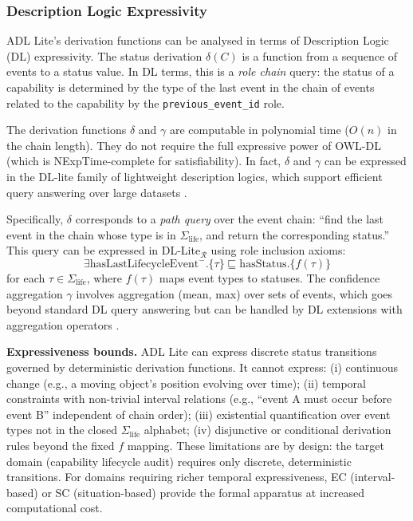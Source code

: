 \subsubsection{Description Logic Expressivity}

ADL Lite's derivation functions can be analysed in terms of Description Logic (DL) expressivity. The status derivation $\delta(C)$ is a function from a sequence of events to a status value. In DL terms, this is a \emph{role chain} query: the status of a capability is determined by the type of the last event in the chain of events related to the capability by the \texttt{previous\_event\_id} role.

The derivation functions $\delta$ and $\gamma$ are computable in polynomial time ($O(n)$ in the chain length). They do not require the full expressive power of OWL-DL (which is NExpTime-complete for satisfiability). In fact, $\delta$ and $\gamma$ can be expressed in the DL-lite family of lightweight description logics, which support efficient query answering over large datasets \cite{dl_lite}.

Specifically, $\delta$ corresponds to a \emph{path query} over the event chain: ``find the last event in the chain whose type is in $\Sigma_{\text{life}}$, and return the corresponding status.'' This query can be expressed in DL-Lite$_{\mathcal{R}}$ using role inclusion axioms:
\begin{equation}
    \exists \text{hasLastLifecycleEvent}^-.\{\tau\} \sqsubseteq \text{hasStatus}.\{f(\tau)\}
\end{equation}
for each $\tau \in \Sigma_{\text{life}}$, where $f(\tau)$ maps event types to statuses. The confidence aggregation $\gamma$ involves aggregation (mean, max) over sets of events, which goes beyond standard DL query answering but can be handled by DL extensions with aggregation operators \cite{dl_lite}.

\textbf{Expressiveness bounds.} ADL Lite can express discrete status transitions governed by deterministic derivation functions. It cannot express: (i) continuous change (e.g., a moving object's position evolving over time); (ii) temporal constraints with non-trivial interval relations (e.g., ``event A must occur before event B'' independent of chain order); (iii) existential quantification over event types not in the closed $\Sigma_{\text{life}}$ alphabet; (iv) disjunctive or conditional derivation rules beyond the fixed $f$ mapping. These limitations are by design: the target domain (capability lifecycle audit) requires only discrete, deterministic transitions. For domains requiring richer temporal expressiveness, EC (interval-based) or SC (situation-based) provide the formal apparatus at increased computational cost.

